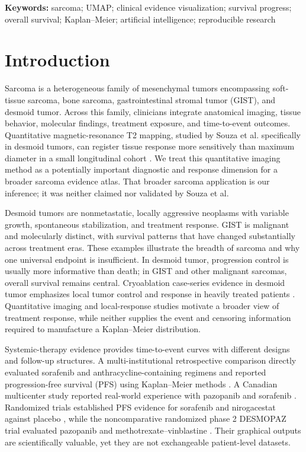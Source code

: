 \documentclass[17pt]{extarticle}
\begin{document}
\textbf{Keywords:} sarcoma; UMAP; clinical evidence visualization; survival progress; overall survival; Kaplan--Meier; artificial intelligence; reproducible research

\section{Introduction}

Sarcoma is a heterogeneous family of mesenchymal tumors encompassing soft-tissue sarcoma, bone sarcoma, gastrointestinal stromal tumor (GIST), and desmoid tumor. Across this family, clinicians integrate anatomical imaging, tissue behavior, molecular findings, treatment exposure, and time-to-event outcomes. Quantitative magnetic-resonance T2 mapping, studied by Souza et al. specifically in desmoid tumors, can register tissue response more sensitively than maximum diameter in a small longitudinal cohort \citep{souza2023t2}. We treat this quantitative imaging method as a potentially important diagnostic and response dimension for a broader sarcoma evidence atlas. That broader sarcoma application is our inference; it was neither claimed nor validated by Souza et al.

Desmoid tumors are nonmetastatic, locally aggressive neoplasms with variable growth, spontaneous stabilization, and treatment response. GIST is malignant and molecularly distinct, with survival patterns that have changed substantially across treatment eras. These examples illustrate the breadth of sarcoma and why one universal endpoint is insufficient. In desmoid tumor, progression control is usually more informative than death; in GIST and other malignant sarcomas, overall survival remains central. Cryoablation case-series evidence in desmoid tumor emphasizes local tumor control and response in heavily treated patients \citep{liu2022cryo}. Quantitative imaging and local-response studies motivate a broader view of treatment response, while neither supplies the event and censoring information required to manufacture a Kaplan--Meier distribution.

Systemic-therapy evidence provides time-to-event curves with different designs and follow-up structures. A multi-institutional retrospective comparison directly evaluated sorafenib and anthracycline-containing regimens and reported progression-free survival (PFS) using Kaplan--Meier methods \citep{costa2025sorafenib}. A Canadian multicenter study reported real-world experience with pazopanib and sorafenib \citep{noujaim2024realworld}. Randomized trials established PFS evidence for sorafenib and nirogacestat against placebo \citep{gounder2018sorafenib,gounder2023nirogacestat}, while the noncomparative randomized phase 2 DESMOPAZ trial evaluated pazopanib and methotrexate--vinblastine \citep{toulmonde2019desmopaz}. Their graphical outputs are scientifically valuable, yet they are not exchangeable patient-level datasets.
\end{document}
